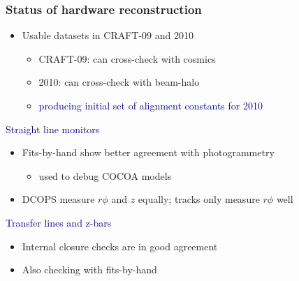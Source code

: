 \documentclass[compress]{beamer}
\begin{document}
\begin{frame}
\frametitle{Status of hardware reconstruction}

\begin{itemize}\setlength{\itemsep}{0.5 cm}
\item Usable datasets in CRAFT-09 and 2010
\begin{itemize}
\item CRAFT-09: can cross-check with cosmics
\item 2010: can cross-check with beam-halo
\item \textcolor{darkblue}{producing initial set of alignment constants for 2010}
\end{itemize}
\end{itemize}

\vfill
\hspace{-0.83 cm} \textcolor{darkblue}{\large Straight line monitors}

\vspace{0.1 cm}
\begin{itemize}
\item Fits-by-hand show better agreement with photogrammetry
\begin{itemize}
\item used to debug COCOA models
\end{itemize}

\item DCOPS measure $r\phi$ and $z$ equally; tracks only measure $r\phi$ well
\end{itemize}

\vfill
\hspace{-0.83 cm} \textcolor{darkblue}{\large Transfer lines and z-bars}

\vspace{0.1 cm}
\begin{itemize}
\item Internal closure checks are in good agreement
\item Also checking with fits-by-hand
\end{itemize}
\end{frame}
\end{document}
